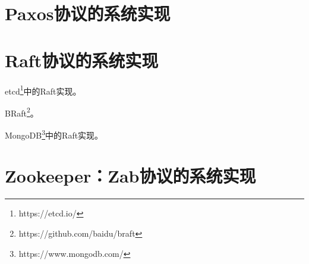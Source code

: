 \chapter{Paxos协议的系统实现}


\chapter{Raft协议的系统实现}

etcd\footnote{https://etcd.io/}中的Raft实现。

BRaft\footnote{https://github.com/baidu/braft}。

MongoDB\footnote{https://www.mongodb.com/}中的Raft实现。


\chapter{Zookeeper：Zab协议的系统实现}